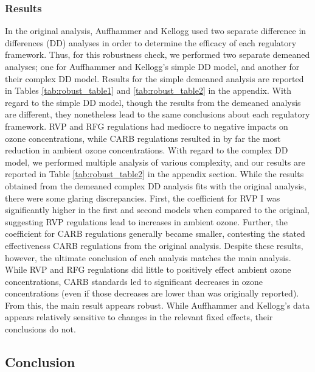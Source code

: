 \documentclass{article}
\begin{document}
\subsubsection{Results}

In the original analysis, Auffhammer and Kellogg used two separate difference in differences (DD) analyses in order to determine the efficacy of each regulatory framework. Thus, for this robustness check, we performed two separate demeaned analyses; one for Auffhammer and Kellogg's simple DD model, and another for their complex DD model. Results for the simple demeaned analysis are reported in Tables \ref{tab:robust_table1} and \ref{tab:robust_table2} in the appendix. With regard to the simple DD model, though the results from the demeaned analysis are different, they nonetheless lead to the same conclusions about each regulatory framework. RVP and RFG regulations had mediocre to negative impacts on ozone concentrations, while CARB regulations resulted in by far the most reduction in ambient ozone concentrations. With regard to the complex DD model, we performed multiple analysis of various complexity, and our results are reported in Table \ref{tab:robust_table2} in the appendix section. While the results obtained from the demeaned complex DD analysis fits with the original analysis, there were some glaring discrepancies. First, the coefficient for RVP I was significantly higher in the first and second models when compared to the original, suggesting RVP regulations lead to increases in ambient ozone. Further, the coefficient for CARB regulations generally became smaller, contesting the stated effectiveness CARB regulations from the original analysis. Despite these results, however, the ultimate conclusion of each analysis matches the main analysis. While RVP and RFG regulations did little to positively effect ambient ozone concentrations, CARB standards led to significant decreases in ozone concentrations (even if those decreases are lower than was originally reported). From this, the main result appears robust. While Auffhammer and Kellogg's data appears relatively sensitive to changes in the relevant fixed effects, their conclusions do not. 


\subsection{Conclusion}
\end{document}
